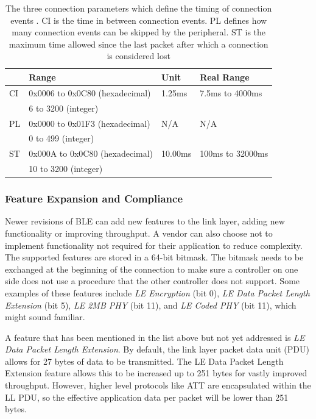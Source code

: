 \begin{table}
    \begin{center}
    \begin{tabular}{|l|l|l|l|}
        \hline
         & \textbf{Range} & \textbf{Unit} & \textbf{Real Range} \\
        \hline
        CI          & 0x0006 to 0x0C80 (hexadecimal) & 1.25ms &  7.5ms to 4000ms  \\
                    & 6 to 3200 (integer) & & \\
        \hline
        PL          & 0x0000 to 0x01F3 (hexadecimal) & N/A & N/A \\
                    & 0 to 499 (integer) & & \\
        \hline
        ST          & 0x000A to 0x0C80 (hexadecimal) & 10.00ms & 100ms to 32000ms \\
                    & 10 to 3200 (integer) & & \\
        \hline
    \end{tabular}
    \end{center}
    \caption{The three connection parameters which define the timing of connection events \cite{bluetooth_spec}. CI is the time in between connection events. PL defines how many connection events can be skipped by the peripheral. ST is the maximum time allowed since the last packet after which a connection is considered lost}
    \label{tbl:conn_params}
\end{table}


\subsubsection{Feature Expansion and Compliance}
Newer revisions of BLE can add new features to the link layer, adding new functionality or improving throughput. A vendor can also choose not to implement functionality not required for their application to reduce complexity. The supported features are stored in a 64-bit bitmask. The bitmask needs to be exchanged at the beginning of the connection to make sure a controller on one side does not use a procedure that the other controller does not support. Some examples of these features include \textit{LE Encryption} (bit 0), \textit{LE Data Packet Length Extension} (bit 5), \textit{LE 2MB PHY} (bit 11), and \textit{LE Coded PHY} (bit 11), which might sound familiar\cite[p. 2827]{bluetooth_spec}.

A feature that has been mentioned in the list above but not yet addressed is \textit{LE Data Packet Length Extension}. By default, the link layer packet data unit (PDU) allows for 27 bytes of data to be transmitted. The LE Data Packet Length Extension feature allows this to be increased up to 251 bytes for vastly improved throughput. However, higher level protocols like ATT are encapsulated within the LL PDU, so the effective application data per packet will be lower than 251 bytes.

